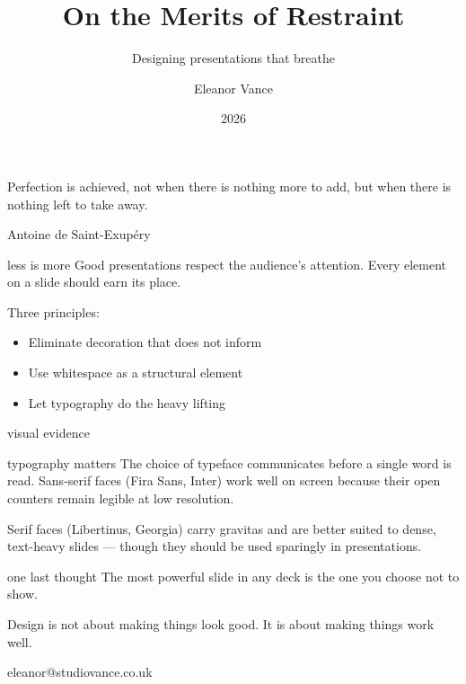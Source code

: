 \documentclass[palette=minimal]{rossbeamerminimal}
\title{On the Merits of Restraint}
\subtitle{Designing presentations that breathe}
\author{Eleanor Vance}
\institute{Studio Vance, London}
\date{2026}
\begin{document}
\begin{frame}[plain]
  \titlepage
\end{frame}

\epigraph{Perfection is achieved, not when there is nothing more to add,
  but when there is nothing left to take away.}{Antoine de Saint-Exup\'ery}

\begin{frame}{less is more}
  Good presentations respect the audience's attention. Every element on
  a slide should earn its place.%

  \vskip12pt
  Three principles:
  \begin{itemize}
    \item Eliminate decoration that does not inform
    \item Use whitespace as a structural element
    \item Let typography do the heavy lifting
  \end{itemize}

\end{frame}

\begin{frame}{visual evidence}
\end{frame}

\begin{frame}{typography matters}
  The choice of typeface communicates before a single word is read.
  Sans-serif faces (Fira Sans, Inter) work well on screen because
  their open counters remain legible at low resolution.%

  \vskip12pt
  Serif faces (Libertinus, Georgia) carry gravitas and are better
  suited to dense, text-heavy slides --- though they should be used
  sparingly in presentations.

\end{frame}

\blankslide

\begin{frame}{one last thought}
  \vfill
  The most powerful slide in any deck is the one you choose not to show.

  \vskip18pt
  Design is not about making things look good. It is about making
  things work well.

  \vskip18pt
  {\color{rbTextMuted}eleanor@studiovance.co.uk}
  \vfill
\end{frame}
\end{document}
